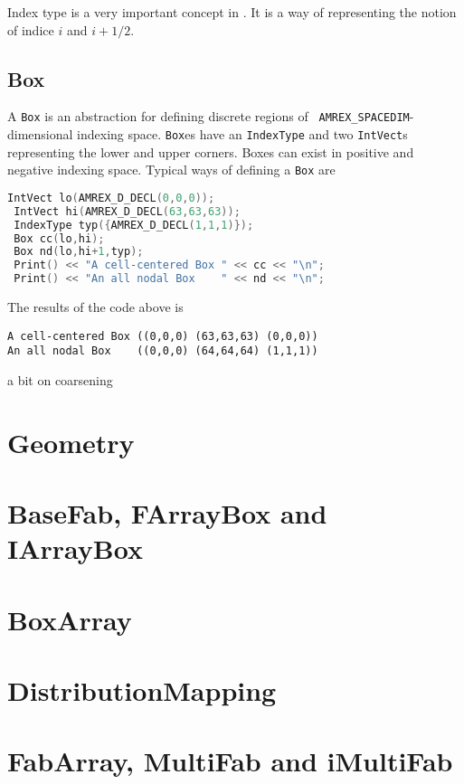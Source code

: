Index type is a very important concept in \amrex.  It is a way of
representing the notion of indice $i$ and $i+1/2$.  

\subsection{Box}

A {\tt Box} is an abstraction for defining discrete regions of {\tt
  AMREX\_SPACEDIM}-dimensional indexing space.  {\tt Box}es have an
{\tt IndexType} and two {\tt IntVect}s representing the lower and
upper corners.  Boxes can exist in positive and negative indexing
space.   Typical ways of defining a {\tt Box} are
\begin{lstlisting}[language=cpp]
 IntVect lo(AMREX_D_DECL(0,0,0));
 IntVect hi(AMREX_D_DECL(63,63,63));
 IndexType typ({AMREX_D_DECL(1,1,1)});
 Box cc(lo,hi);
 Box nd(lo,hi+1,typ);
 Print() << "A cell-centered Box " << cc << "\n";
 Print() << "An all nodal Box    " << nd << "\n";
\end{lstlisting}
The results of the code above is
\begin{verbatim}
A cell-centered Box ((0,0,0) (63,63,63) (0,0,0))
An all nodal Box    ((0,0,0) (64,64,64) (1,1,1))
\end{verbatim}

a bit on coarsening



\section{Geometry}


\section{BaseFab, FArrayBox and IArrayBox}

\section{BoxArray}

\section{DistributionMapping}

\section{FabArray, MultiFab and iMultiFab}
\label{sec:basics:multifab}

